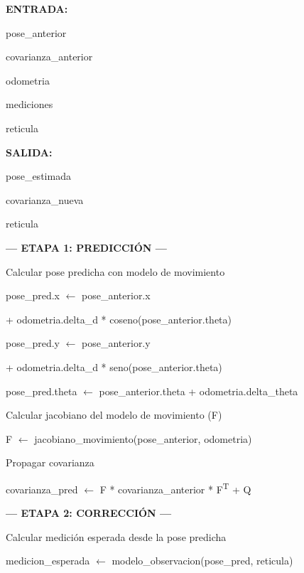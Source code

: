 \begin{algorithmic}[1]

\Statex \textbf{ENTRADA:}

\Statex pose\_anterior

\Statex covarianza\_anterior

\Statex odometria

\Statex mediciones

\Statex reticula

\Statex
\Statex \textbf{SALIDA:}

\Statex pose\_estimada

\Statex covarianza\_nueva

\Statex reticula

\Statex
\Statex \textbf{--- ETAPA 1: PREDICCIÓN ---}

\Statex
\State Calcular pose predicha con modelo de movimiento

\State pose\_pred.x $\gets$ pose\_anterior.x

\Statex \hspace{1.3cm}
+ odometria.delta\_d * coseno(pose\_anterior.theta)

\State pose\_pred.y $\gets$ pose\_anterior.y

\Statex \hspace{1.3cm}
+ odometria.delta\_d * seno(pose\_anterior.theta)

\State pose\_pred.theta $\gets$
pose\_anterior.theta + odometria.delta\_theta

\Statex
\State Calcular jacobiano del modelo de movimiento (F)

\State F $\gets$
jacobiano\_movimiento(pose\_anterior, odometria)

\Statex
\State Propagar covarianza

\State covarianza\_pred $\gets$
F * covarianza\_anterior * F\textsuperscript{T} + Q

\Statex {}

\Statex
\Statex \textbf{--- ETAPA 2: CORRECCIÓN ---}

\Statex
\State Calcular medición esperada desde la pose predicha

\State medicion\_esperada $\gets$
modelo\_observacion(pose\_pred, reticula)


\end{algorithmic}
